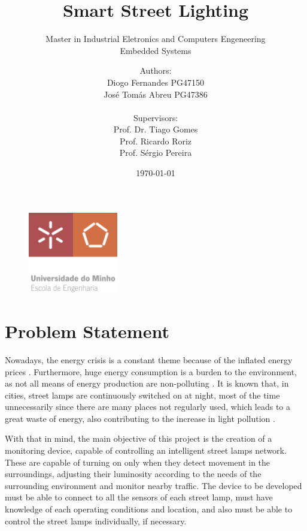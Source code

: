 \documentclass[12pt, letterpaper]{article}
\title{\textbf{Smart Street Lighting}}
\subtitle{{\large Master in Industrial Eletronics and Computers Engeneering} \\ {\large Embedded Systems}}
\author{Authors:\\Diogo Fernandes PG47150\\José Tomás Abreu PG47386\\ \\ Supervisors:\\Prof. Dr. Tiago Gomes\\Prof. Ricardo Roriz\\Prof. Sérgio Pereira}
\date{\today}
\begin{document}
{\begin{figure}[t]
	\centering
	\includegraphics[width=0.35\textwidth]{EEUMLOGO}
\end{figure}}

\maketitle

\clearpage
\section{Problem Statement}
Nowadays, the energy crisis is a constant theme because of the inflated energy prices \cite{energy_crisis}. Furthermore, huge energy consumption is a burden to the environment, as not all means of energy production are non-polluting \cite{energy_supply}. It is known that, in cities, street lamps are continuously switched on at night, most of the time unnecessarily since there are many places not regularly used, which leads to a great waste of energy, also contributing to the increase in light pollution \cite{light_pollution}.
	
With that in mind, the main objective of this project is the creation of a monitoring device, capable of controlling an intelligent street lamps network. These are capable of turning on only when they detect movement in the surroundings, adjusting their luminosity according to the needs of the surrounding environment and monitor nearby traffic. The device to be developed must be able to connect to all the sensors of each street lamp, must have knowledge of each operating conditions and location, and also must be able to control the street lamps individually, if necessary.





\end{document}
